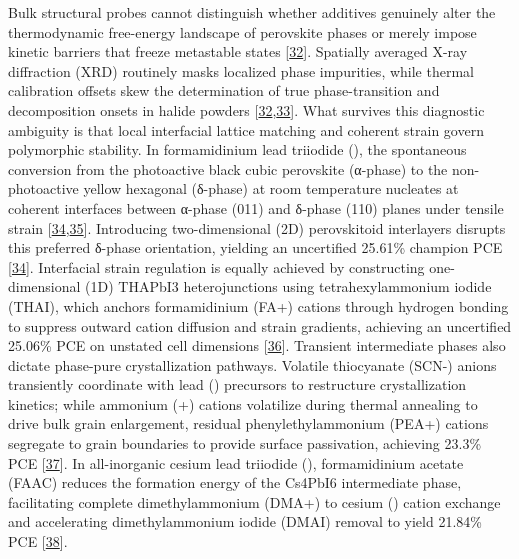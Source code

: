 \documentclass[
  11pt,
]{article}
\begin{document}
Bulk structural probes cannot distinguish whether additives genuinely
alter the thermodynamic free-energy landscape of perovskite phases or
merely impose kinetic barriers that freeze metastable states
{[}\href{https://doi.org/10.22541/authorea.15004927/v1}{32}{]}.
Spatially averaged X-ray diffraction (XRD) routinely masks localized
phase impurities, while thermal calibration offsets skew the
determination of true phase-transition and decomposition onsets in
halide powders
{[}\href{https://doi.org/10.22541/authorea.15004927/v1}{32},\href{https://doi.org/10.48550/arxiv.2606.27592}{33}{]}.
What survives this diagnostic ambiguity is that local interfacial
lattice matching and coherent strain govern polymorphic stability. In
formamidinium lead triiodide (), the spontaneous conversion
from the photoactive black cubic perovskite (α-phase) to the
non-photoactive yellow hexagonal (δ-phase) at room temperature nucleates
at coherent interfaces between α-phase (011) and δ-phase (110) planes
under tensile strain
{[}\href{https://doi.org/10.1038/s41467-026-73739-0}{34},\href{https://doi.org/10.1002/solr.70396}{35}{]}.
Introducing two-dimensional (2D) perovskitoid interlayers disrupts this
preferred δ-phase orientation, yielding an uncertified 25.61\% champion
PCE {[}\href{https://doi.org/10.1038/s41467-026-73739-0}{34}{]}.
Interfacial strain regulation is equally achieved by constructing
one-dimensional (1D) THAPbI3 heterojunctions using tetrahexylammonium
iodide (THAI), which anchors formamidinium (FA+) cations through
hydrogen bonding to suppress outward cation diffusion and strain
gradients, achieving an uncertified 25.06\% PCE on unstated cell
dimensions {[}\href{https://doi.org/10.1021/acsaem.6c01363}{36}{]}.
Transient intermediate phases also dictate phase-pure crystallization
pathways. Volatile thiocyanate (SCN-) anions transiently coordinate with
lead () precursors to restructure crystallization kinetics;
while ammonium (+) cations volatilize during thermal annealing
to drive bulk grain enlargement, residual phenylethylammonium (PEA+)
cations segregate to grain boundaries to provide surface passivation,
achieving 23.3\% PCE
{[}\href{https://doi.org/10.1021/acsaem.6c01329}{37}{]}. In
all-inorganic cesium lead triiodide (), formamidinium acetate
(FAAC) reduces the formation energy of the Cs4PbI6 intermediate phase,
facilitating complete dimethylammonium (DMA+) to cesium ()
cation exchange and accelerating dimethylammonium iodide (DMAI) removal
to yield 21.84\% PCE
{[}\href{https://doi.org/10.1021/acs.jpclett.6c01395}{38}{]}.
\end{document}
